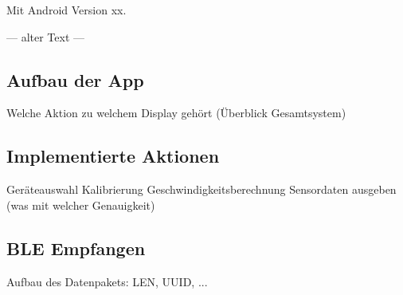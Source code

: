 Mit Android Version xx.

--- alter Text --- 

\subsection{Aufbau der App}

Welche Aktion zu welchem Display gehört (Überblick Gesamtsystem)


\subsection{Implementierte Aktionen}
Geräteauswahl
Kalibrierung
Geschwindigkeitsberechnung
Sensordaten ausgeben (was mit welcher Genauigkeit)

\subsection{BLE Empfangen}

Aufbau des Datenpakets: 
LEN, UUID, ...






